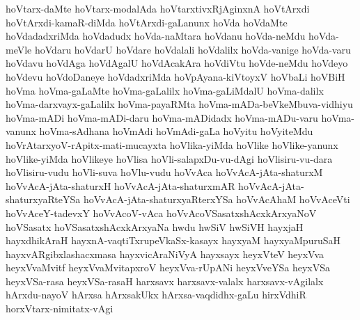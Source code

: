 {hoVtarx-daMte
hoVtarx-modalAda
hoVtarxtivxRjAginxnA
hoVtArxdi
hoVtArxdi-kamaR-diMda
hoVtArxdi-gaLanunx
hoVda
hoVdaMte
hoVdadadxriMda
hoVdadudx
hoVda-naMtara
hoVdanu
hoVda-neMdu
hoVda-meVle
hoVdaru
hoVdarU
hoVdare
hoVdalali
hoVdalilx
hoVda-vanige
hoVda-varu
hoVdavu
hoVdAga
hoVdAgalU
hoVdAcakAra
hoVdiVtu
hoVde-neMdu
hoVdeyo
hoVdevu
hoVdoDaneye
hoVdadxriMda
hoVpAyana-kiVtoyxV
hoVbaLi
hoVBiH
hoVma
hoVma-gaLaMte
hoVma-gaLalilx
hoVma-gaLiMdalU
hoVma-dalilx
hoVma-darxvayx-gaLalilx
hoVma-payaRMta
hoVma-mADa-beVkeMbuva-vidhiyu
hoVma-mADi
hoVma-mADi-daru
hoVma-mADidadx
hoVma-mADu-varu
hoVma-vanunx
hoVma-sAdhana
hoVmAdi
hoVmAdi-gaLa
hoVyitu
hoVyiteMdu
hoVrAtarxyoV-rApitx-mati-mucayxta
hoVlika-yiMda
hoVlike
hoVlike-yanunx
hoVlike-yiMda
hoVlikeye
hoVlisa
hoVli-salapxDu-vu-dAgi
hoVlisiru-vu-dara
hoVlisiru-vudu
hoVli-suva
hoVlu-vudu
hoVvAca
hoVvAcA-jAta-shaturxM
hoVvAcA-jAta-shaturxH
hoVvAcA-jAta-shaturxmAR
hoVvAcA-jAta-shaturxyaRteYSa
hoVvAcA-jAta-shaturxyaRterxYSa
hoVvAcAhaM
hoVvAceVti
hoVvAceY-tadevxY
hoVvAcoV-vAca
hoVvAcoVSasatxshAcxkArxyaNoV
hoVSasatx
hoVSasatxshAcxkArxyaNa
hwdu
hwSiV
hwSiVH
hayxjaH
hayxdhikAraH
hayxnA-vaqtiTxrupeVkaSx-kasayx
hayxyaM
hayxyaMpuruSaH
hayxvARgibxlashacxmasa
hayxvicAraNiVyA
hayxsayx
heyxVteV
heyxVva
heyxVvaMvitf
heyxVvaMvitapxroV
heyxVva-rUpANi
heyxVveYSa
heyxVSa
heyxVSa-rasa
heyxVSa-rasaH
harxsavx
harxsavx-valalx
harxsavx-vAgilalx
hArxdu-nayoV
hArxsa
hArxsakUkx
hArxsa-vaqdidhx-gaLu
hirxVdhiR
horxVtarx-nimitatx-vAgi
}
